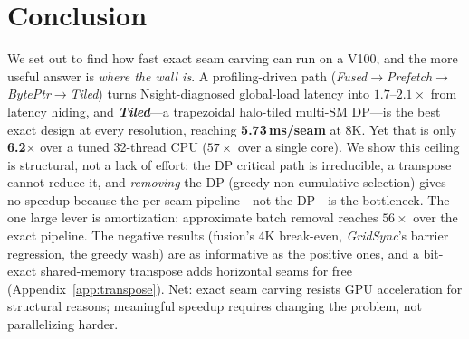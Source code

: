 \section{Conclusion}
We set out to find how fast exact seam carving can run on a V100, and the more
useful answer is \emph{where the wall is}. A profiling-driven path
(\emph{Fused}$\rightarrow$\emph{Prefetch}$\rightarrow$\emph{BytePtr}$\rightarrow$\emph{Tiled})
turns Nsight-diagnosed global-load latency into $1.7$--$2.1\times$ from latency
hiding, and \textbf{\emph{Tiled}}---a trapezoidal halo-tiled multi-SM DP---is the
best exact design at every resolution, reaching \textbf{5.73\,ms/seam} at 8K.
Yet that is only \textbf{6.2$\times$} over a tuned 32-thread CPU
($57\times$ over a single core). We show this ceiling is structural, not a lack
of effort: the DP critical path is irreducible, a transpose cannot reduce it,
and \emph{removing} the DP (greedy non-cumulative selection) gives no speedup
because the per-seam pipeline---not the DP---is the bottleneck. The one large
lever is amortization: approximate batch removal reaches $56\times$ over the
exact pipeline. The negative results (fusion's 4K break-even, \emph{GridSync}'s
barrier regression, the greedy wash) are as informative as the positive ones,
and a bit-exact shared-memory transpose adds horizontal seams for free
(Appendix~\ref{app:transpose}). Net: exact seam carving resists GPU acceleration
for structural reasons; meaningful speedup requires changing the problem, not
parallelizing harder.
